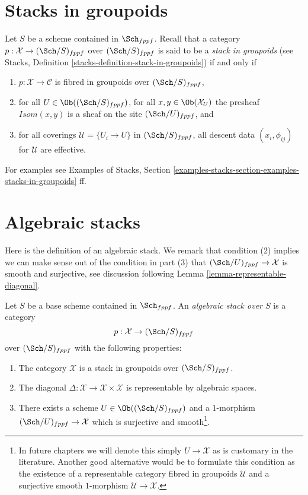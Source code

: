 \section{Stacks in groupoids}
\label{section-stacks}

\noindent
Let $S$ be a scheme contained in $\Sch_{fppf}$.
Recall that a category $p : \mathcal{X} \to (\Sch/S)_{fppf}$
over $(\Sch/S)_{fppf}$ is said to be a
{\it stack in groupoids} (see
Stacks, Definition \ref{stacks-definition-stack-in-groupoids})
if and only if
\begin{enumerate}
\item $p : \mathcal{X} \to \mathcal{C}$ is fibred
in groupoids over $(\Sch/S)_{fppf}$,
\item for all $U \in \Ob((\Sch/S)_{fppf})$,
for all $x, y\in \Ob(\mathcal{X}_U)$ the presheaf
$\mathit{Isom}(x, y)$ is a sheaf on the site $(\Sch/U)_{fppf}$, and
\item for all coverings $\mathcal{U} = \{U_i \to U\}$ in
$(\Sch/S)_{fppf}$, all descent data $(x_i, \phi_{ij})$
for $\mathcal{U}$ are effective.
\end{enumerate}
For examples see
Examples of Stacks,
Section \ref{examples-stacks-section-examples-stacks-in-groupoids}
ff.










\section{Algebraic stacks}
\label{section-algebraic-stacks}

\noindent
Here is the definition of an algebraic stack. We remark that condition
(2) implies we can make sense out of the condition in part (3) that
$(\Sch/U)_{fppf} \to \mathcal{X}$
is smooth and surjective, see discussion following
Lemma \ref{lemma-representable-diagonal}.

\begin{definition}
\label{definition-algebraic-stack}
Let $S$ be a base scheme contained in $\Sch_{fppf}$.
An {\it algebraic stack over $S$} is a category
$$
p : \mathcal{X} \to (\Sch/S)_{fppf}
$$
over $(\Sch/S)_{fppf}$ with the following properties:
\begin{enumerate}
\item The category $\mathcal{X}$ is a stack in groupoids over
$(\Sch/S)_{fppf}$.
\item The diagonal
$\Delta : \mathcal{X} \to \mathcal{X} \times \mathcal{X}$
is representable by algebraic spaces.
\item There exists a scheme $U \in \Ob((\Sch/S)_{fppf})$
and a $1$-morphism $(\Sch/U)_{fppf} \to \mathcal{X}$
which is surjective and smooth\footnote{In future chapters we will denote
this simply $U \to \mathcal{X}$ as is customary in the literature. Another
good alternative would be to formulate this condition as the existence of a
representable category fibred in groupoids $\mathcal{U}$ and a surjective
smooth $1$-morphism $\mathcal{U} \to \mathcal{X}$.}.
\end{enumerate}
\end{definition}

